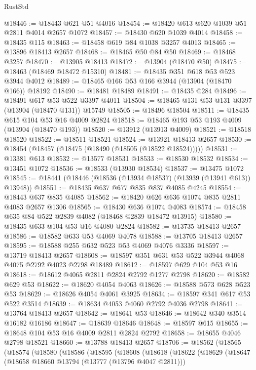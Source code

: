 \begin{lexlean}{RustStd}
\begin{coremodule}
@18446 := @18443 @621 @51 @4016
@18454 := @18420 @613 @620 @1039 @51 @2811 @4014 @2657 @1072
@18457 := @18430 @620 @1039 @4014
@18458 := @18435 @115
@18463 := @18458 @619 @84 @1038 @3257 @4013
@18465 := @13896 @18413 @2657
@18468 := @18465 @50 @84 @50
@18469 := @18468 @3257
@18470 := @13905 @18413
@18472 := @13904 (@18470 @50)
@18475 := @18463 (@18469 @18472 @15310)
@18481 := @18435 @351 @618 @53 @523 @3944 @4012
@18489 := @18465 @166 @53 @166 @3944 (@13904 (@18470 @166)) @18192
@18490 := @18481 @18489
@18491 := @18435 @284
@18496 := @18491 @617 @53 @522 @3397 @4011
@18504 := @18465 @131 @53 @131 @3397 (@13904 (@18470 @131)) @15749
@18505 := @18496 @18504
@18511 := @18435 @615 @104 @53 @16 @4009 @2824
@18518 := @18465 @193 @53 @193 @4009 (@13904 (@18470 @193))
@18520 := @13912 (@13913 @4009)
@18521 := @18518 @18520
@18522 := @18511 @18521
@18524 := @13921 @18413 @2657
@18530 := @18454 (@18457 (@18475 (@18490 (@18505 (@18522 @18524)))))
@18531 := @13381 @613
@18532 := @13577 @18531
@18533 := @18530 @18532
@18534 := @13451 @1072
@18536 := @18533 (@13930 @18534)
@18537 := @13475 @1072
@18545 := @18441 (@18446 (@18536 (@13934 @18537) (@13939 (@13941 @613)) @13948))
@18551 := @18435 @637 @677 @835 @837 @4085 @4245
@18554 := @18443 @637 @835 @4085
@18562 := @18420 @626 @636 @1074 @835 @2811 @4083 @2657 @1306
@18565 := @18430 @636 @1074 @4083
@18574 := @18458 @635 @84 @522 @2839 @4082 (@18468 @2839 @18472 @13915)
@18580 := @18435 @633 @104 @53 @16 @4080 @2824
@18582 := @13735 @18413 @2657
@18586 := @18582 @633 @53 @4069 @4078
@18588 := @13705 @18413 @2657
@18595 := @18588 @255 @632 @523 @53 @4069 @4076 @3336
@18597 := @13719 @18413 @2657
@18608 := @18597 @351 @631 @53 @522 @3944 @4068 @4075 @2792 @4023 @2798 @18489
@18612 := @18597 @629 @104 @53 @16
@18618 := @18612 @4065 @2811 @2824 @2792 @1277 @2798
@18620 := @18582 @629 @53
@18622 := @18620 @4054 @4063
@18626 := @18588 @573 @628 @523 @53
@18629 := @18626 @4054 @4061 @3925
@18634 := @18597 @341 @617 @53 @522 @3514
@18639 := @18634 @4053 @4060 @2792 @4036 @2798
@18641 := @13764 @18413 @2657
@18642 := @18641 @53
@18646 := @18642 @340 @3514 @16182 @16186
@18647 := @18639 @18646
@18648 := @18597 @615
@18655 := @18648 @104 @53 @16 @4009 @2811 @2824 @2792
@18658 := @18655 @4046 @2798 @18521
@18660 := @13788 @18413 @2657
@18706 := @18562
    (@18565
      (@18574
        (@18580
          (@18586
            (@18595
              (@18608
                (@18618
                  (@18622
                    (@18629
                      (@18647
                        (@18658 @18660 @13794 (@13777 (@13796 @4047 @2811)))

\end{coremodule}
\end{lexlean}
